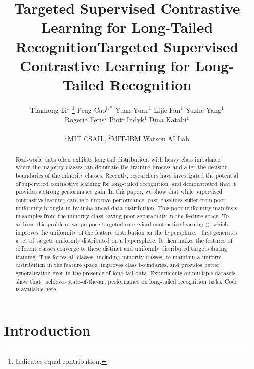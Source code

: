 \title{Targeted Supervised Contrastive Learning for Long-Tailed Recognition}



\title{Targeted Supervised Contrastive Learning for Long-Tailed Recognition}

\author{Tianhong Li$^{1,}$\thanks{Indicates equal contribution.} \quad Peng Cao$^{1,{\ast}}$ \quad Yuan Yuan$^1$ \quad Lijie Fan$^1$ \quad Yuzhe Yang$^1$ \\ 
\quad Rogerio Feris$^2$ \quad Piotr Indyk$^1$ \quad Dina Katabi$^1$ \\\\ $^1$MIT CSAIL, $^2$MIT-IBM Watson AI Lab}
\maketitle

\begin{abstract}

Real-world data often exhibits long tail distributions with heavy class imbalance, where the majority classes can dominate the training process and alter the decision boundaries of the minority classes. Recently, researchers have investigated the potential of supervised contrastive learning for long-tailed recognition, and demonstrated that it provides a strong performance gain. In this paper, we show that while supervised contrastive learning can help improve performance, past baselines suffer from poor uniformity brought in by imbalanced data distribution. This poor uniformity manifests in samples from the minority class having poor separability in the feature space. To address this problem, we propose targeted supervised contrastive learning (\name), which improves the uniformity of the feature distribution on the hypersphere. \name\ first generates a set of targets uniformly distributed on a hypersphere. It then makes the features of different classes converge to these distinct and uniformly distributed targets during training.  This forces all classes, including minority classes, to maintain a uniform distribution in the feature space, improves class boundaries, and provides better generalization even in the presence of long-tail data. Experiments on multiple datasets show that \name~achieves state-of-the-art performance on long-tailed recognition tasks. Code is available \href{https://github.com/LTH14/targeted-supcon}{here}.\end{abstract}
 
\section{Introduction}\label{sec:intro}

